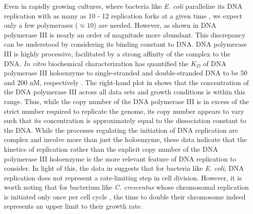 Even in rapidly growing cultures, where bacteria like \textit{E. coli}
parallelize its DNA replication  with as many as 10 - 12 replication forks at a
given time \citep{bremer2008, si2017},  we expect only a few polymerases
($\approx 10$) are needed. However, as shown in  DNA
polymerase III is nearly an order of magnitude more abundant. This discrepancy
can be understood by considering its binding constant to DNA. DNA polymerase III
is highly processive, facilitated by a strong affinity of the complex to the
DNA. \textit{In vitro} biochemical characterization has quantified the $K_D$ of
DNA polymerase III holoenzyme to single-stranded and double-stranded DNA to be
50 and 200 nM, respectively \citep{ason2000}. The right-hand plot in
 shows that the concentration of the DNA polymerase III
across all data sets and growth conditions is within this range. Thus, while the
copy number of the DNA polymerase III is in excess of the strict number required
to replicate the genome, its copy number appears to vary such that its
concentration is approximately equal to the dissociation constant to the DNA.
While the processes regulating the initiation of DNA replication are complex and
involve more than just the holoenzyme, these data indicate that the kinetics of
replication rather than the explicit copy number of the DNA polymerase III
holoenzyme is the more relevant feature of DNA replication to consider. In light
of this, the data in  suggests that for bacteria like
\textit{E. coli}, DNA replication does not represent a rate-limiting step in
cell division. However, it is worth noting that for bacterium like \textit{C.
crescentus} whose chromosomal replication is initiated only once per cell cycle
\citep{jensen2001}, the time to double their chromosome indeed represents an
upper limit to their growth rate.
